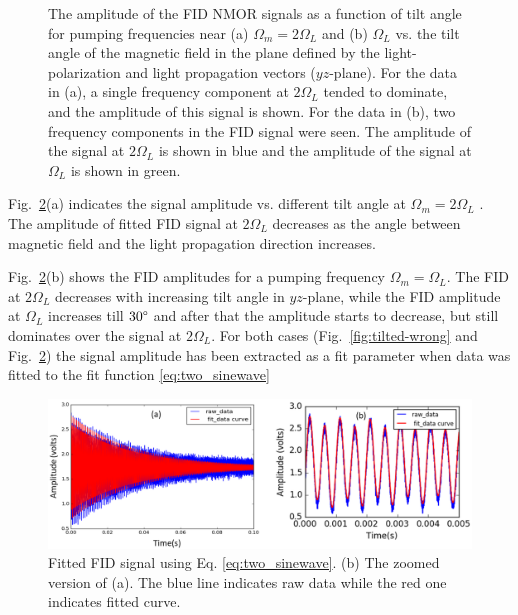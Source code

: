 \begin{figure}
\begin{subfigure}[b]{0.49\textwidth}
    \caption{}
    \label{fig:tilt_x}
  \end{subfigure}
  \caption{The amplitude of the FID NMOR signals as a function of tilt
    angle for pumping frequencies near (a) $\Omega_m=2\Omega_L$ and
    (b) $\Omega_L$ vs. the tilt angle of the magnetic field in the
    plane defined by the light-polarization and light propagation
    vectors ($yz$-plane). For the data in (a), a single frequency
    component at $2\Omega_L$ tended to dominate, and the amplitude of
    this signal is shown.  For the data in (b), two frequency
    components in the FID signal were seen.  The amplitude of the
    signal at $2\Omega_L$ is shown in blue and the amplitude of the
    signal at $\Omega_L$ is shown in
    green.\label{fig:something-tilted}}
\end{figure}

Fig.~\ref{fig:something-tilted}(a) indicates the signal amplitude
vs. different tilt angle at $\Omega_m=2\Omega_L$ . The amplitude of
fitted FID signal at $2\Omega_L$ decreases as the angle between
magnetic field and the light propagation direction increases.

Fig.~\ref{fig:something-tilted}(b) shows the FID amplitudes for a
pumping frequency $\Omega_m=\Omega_L$. The FID at $2\Omega_L$
decreases with increasing tilt angle in $yz$-plane, while the FID
amplitude at $\Omega_L$ increases till $30\degree$ and after that the
amplitude starts to decrease, but still dominates over the signal at
$2\Omega_L$. For both cases (Fig.~\ref{fig:tilted-wrong} and
Fig.~\ref{fig:something-tilted}) the signal amplitude has been
extracted as a fit parameter when data was fitted to the fit function
\ref{eq:two_sinewave}

\begin{figure}%
\centering\includegraphics[width=\linewidth]{figures/fitted_data_tilted_field.png}
\caption{Fitted FID signal using Eq. \ref{eq:two_sinewave}. (b) The
  zoomed version of (a). The blue line indicates raw data while the
  red one indicates fitted curve.\label{fig:ex1}}
\end{figure}

